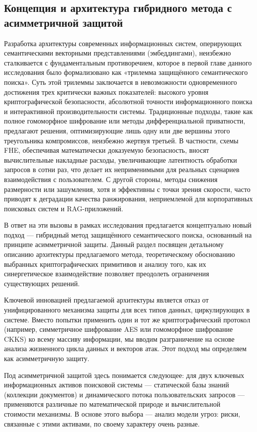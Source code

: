 \documentclass[a4paper, 12pt, oneside, openany]{article}
\begin{document}
\subsection{Концепция и архитектура гибридного метода с асимметричной защитой}\label{subsec:threat-model}

Разработка архитектуры современных информационных систем, оперирующих семантическими векторными представлениями (эмбеддингами), неизбежно сталкивается с фундаментальным противоречием, которое в первой главе данного исследования было формализовано как «трилемма защищённого семантического поиска». Суть этой трилеммы заключается в невозможности одновременного достижения трех критически важных показателей: высокого уровня криптографической безопасности, абсолютной точности информационного поиска и интерактивной производительности системы. Традиционные подходы, такие как полное гомоморфное шифрование или методы дифференциальной приватности, предлагают решения, оптимизирующие лишь одну или две вершины этого треугольника компромиссов, неизбежно жертвуя третьей. В частности, схемы FHE, обеспечивая математически доказуемую безопасность, вносят вычислительные накладные расходы, увеличивающие латентность обработки запросов в сотни раз, что делает их неприменимыми для реальных сценариев взаимодействия с пользователем. С другой стороны, методы снижения размерности или зашумления, хотя и эффективны с точки зрения скорости, часто приводят к деградации качества ранжирования, неприемлемой для корпоративных поисковых систем и RAG-приложений.

В ответ на эти вызовы в рамках исследования предлагается концептуально новый подход --- гибридный метод защищённого семантического поиска, основанный на принципе асимметричной защиты. Данный раздел посвящен детальному описанию архитектуры предлагаемого метода, теоретическому обоснованию выбранных криптографических примитивов и анализу того, как их синергетическое взаимодействие позволяет преодолеть ограничения существующих решений.

Ключевой инновацией предлагаемой архитектуры является отказ от унифицированного механизма защиты для всех типов данных, циркулирующих в системе. Вместо попытки применить один и тот же криптографический протокол (например, симметричное шифрование AES или гомоморфное шифрование CKKS) ко всему массиву информации, мы вводим разграничение на основе анализа жизненного цикла данных и векторов атак. Этот подход мы определяем как асимметричную защиту.

Под асимметричной защитой здесь понимается следующее: для двух ключевых информационных активов поисковой системы — статической базы знаний (коллекции документов) и динамического потока пользовательских запросов — применяются различные по математической природе и вычислительной стоимости механизмы. В основе этого выбора — анализ модели угроз: риски, связанные с этими активами, по своему характеру очень разные.
\end{document}
